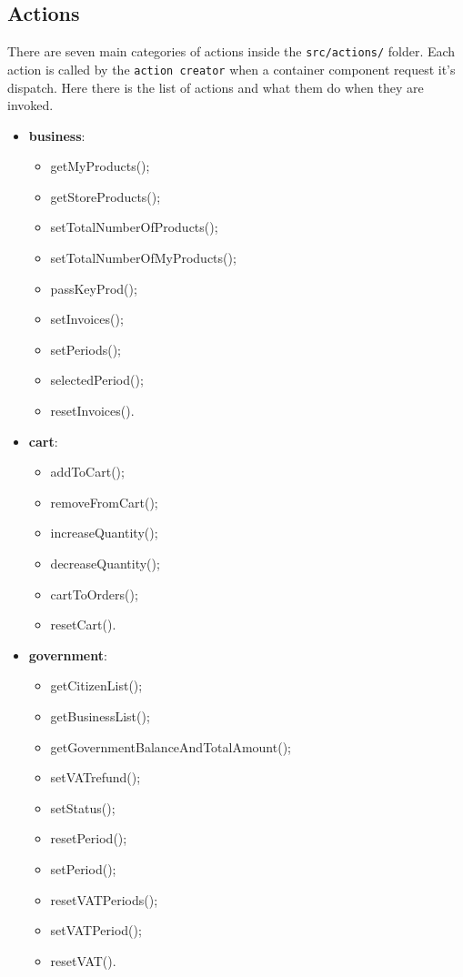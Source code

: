 \subsection{Actions}
There are seven main categories of actions inside the \texttt{src/actions/} folder. Each action is called by the \texttt{action creator} when a container component request it's dispatch. Here there is the list of actions and what them do when they are invoked.
\begin{itemize}
	\item \textbf{business}: \begin{itemize}
		\item getMyProducts();
		\item getStoreProducts();
		\item setTotalNumberOfProducts();
		\item setTotalNumberOfMyProducts();
		\item passKeyProd();
		\item setInvoices();
		\item setPeriods();
		\item selectedPeriod();
		\item resetInvoices().
	\end{itemize}
	\item \textbf{cart}:
	\begin{itemize}
		\item addToCart();
		\item removeFromCart();
		\item increaseQuantity();
		\item decreaseQuantity();
		\item cartToOrders();
		\item resetCart().
	\end{itemize}
	\item \textbf{government}:
	\begin{itemize}
		\item getCitizenList();
		\item getBusinessList();
		\item getGovernmentBalanceAndTotalAmount();
		\item setVATrefund();
		\item setStatus();
		\item resetPeriod();
		\item setPeriod();
		\item resetVATPeriods();
		\item setVATPeriod();
		\item resetVAT().

\end{itemize}
\end{itemize}
